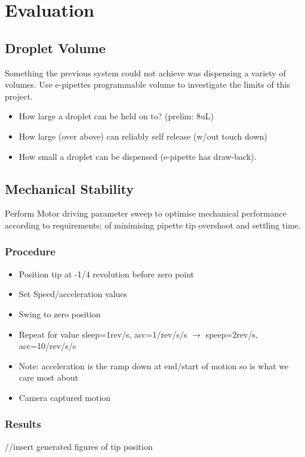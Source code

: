 \chapter{Evaluation}\label{C:eval}

\section{Droplet Volume}
Something the previous system could not achieve was dispensing a variety of volumes.
Use e-pipettes programmable volume to investigate the limits of this project.
\begin{itemize}
    \item How large a droplet can be held on to? (prelim: 8uL)
    \item How large (over above) can reliably self release (w/out touch down)
    \item How small a droplet can be dispensed (e-pipette has draw-back).
\end{itemize}    

\section{Mechanical Stability}
Perform Motor driving parameter sweep to optimise mechanical performance according to requirements; 
of minimising pipette tip overshoot and settling time.
\subsection{Procedure}
\begin{itemize}
    \item Position tip at -1/4 revolution before zero point
    \item Set Speed/acceleration values
    \item Swing to zero position
    \item Repeat for value sleep=1rev/s, acc=1/rev/s/s $\rightarrow$  speep=2rev/s, acc=10/rev/s/s
    \item Note: acceleration is the ramp down at end/start of motion so is what we care most about
    \item Camera captured motion 
\end{itemize}

\subsection{Results}

//insert generated figures of tip position

